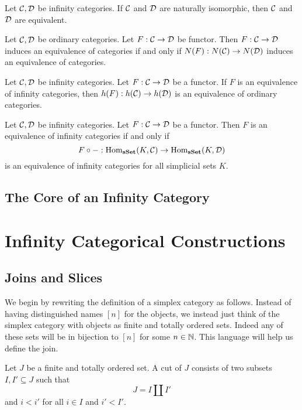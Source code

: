 \documentclass[a4paper]{article}
\begin{document}
\begin{lmm}{}{} Let $\mathcal{C},\mathcal{D}$ be infinity categories. If $\mathcal{C}$ and $\mathcal{D}$ are naturally isomorphic, then $\mathcal{C}$ and $\mathcal{D}$ are equivalent. 
\end{lmm}

\begin{prp}{}{} Let $\mathcal{C},\mathcal{D}$ be ordinary categories. Let $F:\mathcal{C}\to\mathcal{D}$ be functor. Then $F:\mathcal{C}\to\mathcal{D}$ induces an equivalence of categories if and only if $N(F):N(\mathcal{C})\to N(\mathcal{D})$ induces an equivalence of categories. 
\end{prp}

\begin{prp}{}{} Let $\mathcal{C},\mathcal{D}$ be infinity categories. Let $F:\mathcal{C}\to\mathcal{D}$ be a functor. If $F$ is an equivalence of infinity categories, then $h(F):h(\mathcal{C})\to h(\mathcal{D})$ is an equivalence of ordinary categories. 
\end{prp}

\begin{prp}{}{} Let $\mathcal{C},\mathcal{D}$ be infinity categories. Let $F:\mathcal{C}\to\mathcal{D}$ be a functor. Then $F$ is an equivalence of infinity categories if and only if $$F\circ -:\operatorname{Hom}_\bold{sSet}(K,\mathcal{C})\to\operatorname{Hom}_\bold{sSet}(K,\mathcal{D})$$ is an equivalence of infinity categories for all simplicial sets $K$. 
\end{prp}

\subsection{The Core of an Infinity Category}

\pagebreak
\section{Infinity Categorical Constructions}
\subsection{Joins and Slices}
We begin by rewriting the definition of a simplex category as follows. Instead of having distinguished names $[n]$ for the objects, we instead just think of the simplex category with objects as finite and totally ordered sets. Indeed any of these sets will be in bijection to $[n]$ for some $n\in\mathbb{N}$. This language will help us define the join. 

\begin{defn}{}{} Let $J$ be a finite and totally ordered set. A cut of $J$ consists of two subsets $I,I'\subseteq J$ such that $$J=I\amalg I'$$ and $i<i'$ for all $i\in I$ and $i'<I'$. 
\end{defn}
\end{document}
